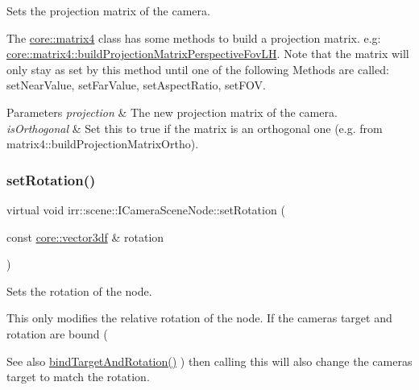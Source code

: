 Sets the projection matrix of the camera. 

The \hyperlink{namespaceirr_1_1core_a73fa92e638c5ca97efd72da307cc9b65}{core\+::matrix4} class has some methods to build a projection matrix. e.\+g\+: \hyperlink{classirr_1_1core_1_1CMatrix4_a1895b967a8f8c9d7ad90fe5434f2499f}{core\+::matrix4\+::build\+Projection\+Matrix\+Perspective\+Fov\+LH}. Note that the matrix will only stay as set by this method until one of the following Methods are called\+: set\+Near\+Value, set\+Far\+Value, set\+Aspect\+Ratio, set\+F\+OV. 
\begin{DoxyParams}{Parameters}
{\em projection} & The new projection matrix of the camera. \\
\hline
{\em is\+Orthogonal} & Set this to true if the matrix is an orthogonal one (e.\+g. from matrix4\+::build\+Projection\+Matrix\+Ortho). \\
\hline
\end{DoxyParams}
\mbox{\label{classirr_1_1scene_1_1ICameraSceneNode_af95d5f50c192f212e11f3f050e92a470}} 
\subsubsection{\texorpdfstring{set\+Rotation()}{setRotation()}}
{\footnotesize\ttfamily virtual void irr\+::scene\+::\+I\+Camera\+Scene\+Node\+::set\+Rotation (\begin{DoxyParamCaption}\item[{const \hyperlink{namespaceirr_1_1core_a06f169d08b5c429f5575acb7edbad811}{core\+::vector3df} \&}]{rotation }\end{DoxyParamCaption})\hspace{0.3cm}{\ttfamily [pure virtual]}}



Sets the rotation of the node. 

This only modifies the relative rotation of the node. If the camera\textquotesingle{}s target and rotation are bound ( \begin{DoxySeeAlso}{See also}
\hyperlink{classirr_1_1scene_1_1ICameraSceneNode_ad8785d7b2f730933a8d4425ac54e7205}{bind\+Target\+And\+Rotation()} ) then calling this will also change the camera\textquotesingle{}s target to match the rotation. 
\end{DoxySeeAlso}

